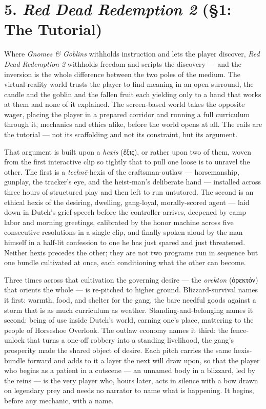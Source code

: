 \documentclass{article}
\newcommand{\gk}[1]{{\greekfont #1}}
\begin{document}
\bigskip

\section*{5. \textit{Red Dead Redemption 2} (§1: The Tutorial)}

Where \textit{Gnomes \& Goblins} withholds instruction and lets the player discover, \textit{Red Dead Redemption 2} withholds freedom and scripts the discovery — and the inversion is the whole difference between the two poles of the medium. The virtual-reality world trusts the player to find meaning in an open surround, the candle and the goblin and the fallen fruit each yielding only to a hand that works at them and none of it explained. The screen-based world takes the opposite wager, placing the player in a prepared corridor and running a full curriculum through it, mechanics and ethics alike, before the world opens at all. The rails are the tutorial — not its scaffolding and not its constraint, but its argument.

That argument is built upon a \textit{hexis} (\gk{ἕξις}), or rather upon two of them, woven from the first interactive clip so tightly that to pull one loose is to unravel the other. The first is a \textit{technē}-hexis of the craftsman-outlaw — horsemanship, gunplay, the tracker's eye, and the heist-man's deliberate hand — installed across three hours of structured play and then left to run untutored. The second is an ethical hexis of the desiring, dwelling, gang-loyal, morally-scored agent — laid down in Dutch's grief-speech before the controller arrives, deepened by camp labor and morning greetings, calibrated by the honor machine across five consecutive resolutions in a single clip, and finally spoken aloud by the man himself in a half-lit confession to one he has just spared and just threatened. Neither hexis precedes the other; they are not two programs run in sequence but one bundle cultivated at once, each conditioning what the other can become.

Three times across that cultivation the governing desire — the \textit{orekton} (\gk{ὀρεκτόν}) that orients the whole — is re-pitched to higher ground. Blizzard-survival names it first: warmth, food, and shelter for the gang, the bare needful goods against a storm that is as much curriculum as weather. Standing-and-belonging names it second: being of use inside Dutch's world, earning one's place, mattering to the people of Horseshoe Overlook. The outlaw economy names it third: the fence-unlock that turns a one-off robbery into a standing livelihood, the gang's prosperity made the shared object of desire. Each pitch carries the same hexis-bundle forward and adds to it a layer the next will draw upon, so that the player who begins as a patient in a cutscene — an unnamed body in a blizzard, led by the reins — is the very player who, hours later, acts in silence with a bow drawn on legendary prey and needs no narrator to name what is happening. It begins, before any mechanic, with a name.
\end{document}
